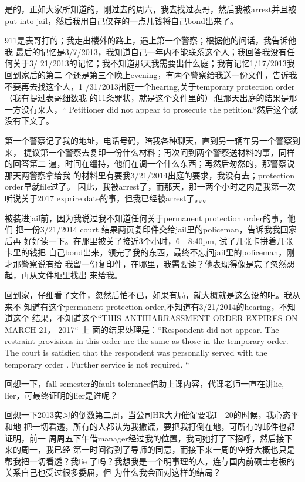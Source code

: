 \documentclass[12pt]{book}
\begin{document}
  是的，正如大家所知道的，刚过去的周六，我去找过表哥，然后我被arrest并且被
put into jail，然后我用自己仅存的一点儿钱将自己bond出来了。

  911是表哥打的；我走出楼外的路上，遇上第一个警察；根据他的问话，我告诉他我
最后的记忆是3/7/2013，我知道自己一年内不能联系这个人；我回答我没有任何关于3/
21/2013的记忆；我不知道那天我需要出什么庭；我有记忆1/17/2013我回到家后的第二
个还是第三个晚上evening，有两个警察给我送一份文件，告诉我不要再去找这个人，1
/31/2013出庭一个hearing,关于temporary protection order （我有提过表哥细数我
的11条罪状，就是这个文件里的）;但那天出庭的结果是那一方没有来人，“
Petitioner did not appear to prosecute the petition.“然后这个就没有下文了。

第一个警察记了我的地址，电话号码，陪我各种聊天，直到另一辆车另一个警察到来，
提议第一个警察去复印一份什么材料；再次问到两个警察送材料的事，同样的回答第二
遍，时间在缰持，他们在调一个什么东西；再然后匆然的，那警察说那天两警察拿给我
的材料里有要我3/21/2014出庭的要求，我没有去；protection order早就file过了。
因此，我被arrest了，而那天，那一两个小时之内是我第一次听说关于2017 exprire 
date的事，但我已经被arrest了。。。

被装进jail前，因为我说过我不知道任何关于permanent protection order的事，他们
把一份3/21/2014 court 结果两页复印件交给jail里的policeman，告诉我我回家后再
好好读一下。在那里被关了接近3个小时，6―8:40pm, 试了几张卡拼着几张卡里的钱把
自己bond出来，领完了我的东西，最终不忘问jail里的policeman，刚才那警察说有给
我留一份复印件，在哪里，我需要读？他表现得像是忘了忽然想起，再从文件柜里找出
来给我。

回到家，仔细看了文件，忽然后怕不已，如果有局，就大概就是这么设的吧。我从来不
知道有这个permanent protection order,不知道有3/21/2014的hearing，不知道这个
结果，不知道这个“THIS ANTIHARRASSMENT ORDER EXPIRES ON MARCH 21， 2017“ 上
面的结果处理是：“Respondent did not appear. The restraint provisions in 
this order are the same as those in the temporary order. The court is 
satisfied that the respondent was personally served with the temporary order
. Further service is not required. “

回想一下，fall semester的fault tolerance借助上课内容，代课老师一直在讲lie, 
lier，可最终证明的lier是谁呢？

回想一下2013实习的倒数第二周，当公司HR大力催促要我I―20的时候，我心态平和地
把一切看透，所有的人都认为我撒谎，要把我打倒在地，可所有的邮件也都证明，前一
周周五下午借manager经过我的位置，我同她打了下招呼，然后接下来的周一，我已经
第一时间得到了导师的同意，而接下来一周的空好大概也只是帮我把一切看透？我lie
了吗？我想我是一个明事理的人，连与国内前硕士老板的关系自己也受过很多委屈，但
为什么我会面对这样的结局？
\end{document}

